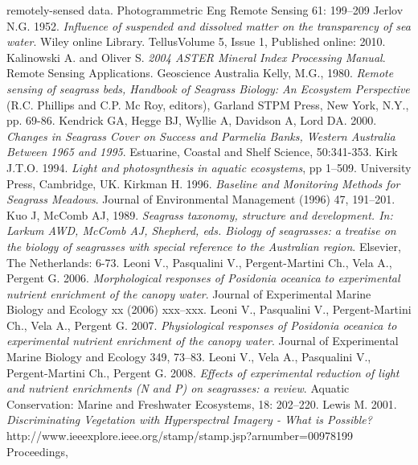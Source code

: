 \documentclass[10pt, a4paper]{article}
\begin{document}
\begin{thebibliography}{999}
{remotely-sensed data}. Photogrammetric Eng Remote Sensing 61: 199–209 \pageref{Jensen95}
Jerlov N.G. 1952. \emph{Influence of suspended and dissolved matter on the transparency of
sea water}. Wiley online Library. TellusVolume 5, Issue 1, Published online: 2010. \pageref{Jerlov52}
Kalinowski A. and Oliver S. \emph{2004 ASTER Mineral Index Processing Manual}. Remote
Sensing Applications. Geoscience Australia \pageref{Kalinowski04}
Kelly, M.G., 1980. \emph{Remote sensing of seagrass beds, Handbook of Seagrass Biology: An
Ecosystem Perspective} (R.C. Phillips and C.P. Mc Roy, editors), Garland STPM Press, New
York, N.Y., pp. 69-86. \pageref{Kelly80}
Kendrick GA, Hegge BJ, Wyllie A, Davidson A, Lord DA. 2000. \emph{Changes in Seagrass
Cover on Success and Parmelia Banks, Western Australia Between 1965 and 1995}.
Estuarine, Coastal and Shelf Science, 50:341-353. \pageref{Kendrick00}
Kirk J.T.O. 1994. \emph{Light and photosynthesis in aquatic ecosystems}, pp 1–509. University
Press, Cambridge, UK. \pageref{Kirk94}
Kirkman H. 1996. \emph{Baseline and Monitoring Methods for Seagrass Meadows}. Journal of
Environmental Management (1996) 47, 191–201. \pageref{Kirkman96}
Kuo J, McComb AJ, 1989. \emph{Seagrass taxonomy, structure and development. In: Larkum
AWD, McComb AJ, Shepherd, eds. Biology of seagrasses: a treatise on the biology of
seagrasses with special reference to the Australian region}. Elsevier, The Netherlands: 6-73. \pageref{Kuo89}
Leoni V., Pasqualini V., Pergent-Martini Ch., Vela A., Pergent G. 2006. \emph{Morphological
responses of \textit{Posidonia oceanica} to experimental nutrient enrichment of the canopy water}.
Journal of Experimental Marine Biology and Ecology xx (2006) xxx–xxx. \pageref{Leoni06}
Leoni V., Pasqualini V., Pergent-Martini Ch., Vela A., Pergent G. 2007. \emph{Physiological
responses of \textit{Posidonia oceanica} to experimental nutrient enrichment of the canopy water}.
Journal of Experimental Marine Biology and Ecology 349, 73–83. \pageref{Leoni07}
Leoni V., Vela A., Pasqualini V., Pergent-Martini Ch., Pergent G. 2008. \emph{Effects of
experimental reduction of light and nutrient enrichments (N and P) on seagrasses: a review}.
Aquatic Conservation: Marine and Freshwater Ecosystems, 18: 202–220. \pageref{Leoni08}
Lewis M. 2001. \emph{Discriminating Vegetation with Hyperspectral Imagery - What is
Possible?} http://www.ieeexplore.ieee.org/stamp/stamp.jsp?arnumber=00978199 Proceedings,

\end{thebibliography}
\end{document}

